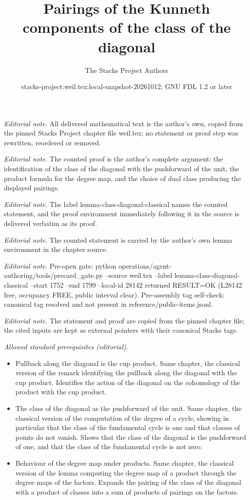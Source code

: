 \documentclass[10pt,a4paper]{amsart}
\title{Pairings of the Kunneth components of the class of the diagonal}
\author{The Stacks Project Authors}
\date{stacks-project:weil.tex:local-snapshot-20261012; GNU FDL 1.2 or later}
\theoremstyle{plain}
\theoremstyle{definition}
\theoremstyle{remark}
\numberwithin{equation}{subsection}
\begin{document}
\maketitle
\noindent\textit{Editorial note.} All delivered mathematical text is the author's own, copied from the pinned Stacks Project chapter file weil.tex; no statement or proof step was rewritten, reordered or removed.\par\medskip
\noindent\textit{Editorial note.} The counted proof is the author's complete argument: the identification of the class of the diagonal with the pushforward of the unit, the product formula for the degree map, and the choice of dual class producing the displayed pairings.\par\medskip
\noindent\textit{Editorial note.} The label lemma-class-diagonal-classical names the counted statement, and the proof environment immediately following it in the source is delivered verbatim as its proof.\par\medskip
\noindent\textit{Editorial note.} The counted statement is carried by the author's own lemma environment in the chapter source.\par\medskip
\noindent\textit{Editorial note.} Pre-open gate: python operations/agent-authoring/tools/precard\_gate.py --source weil.tex --label lemma-class-diagonal-classical --start 1752 --end 1799 --local-id 28142 returned RESULT=OK (L28142 free, occupancy FREE, public interval clear). Pre-assembly tag self-check: canonical tag resolved and not present in reference/public-items.jsonl.\par\medskip
\noindent\textit{Editorial note.} The statement and proof are copied from the pinned chapter file; the cited inputs are kept as external pointers with their canonical Stacks tags.\par\medskip
\noindent\textit{Allowed standard prerequisites (editorial).}\begin{itemize}
\item Pullback along the diagonal is the cup product. Same chapter, the classical version of the remark identifying the pullback along the diagonal with the cup product. Identifies the action of the diagonal on the cohomology of the product with the cup product.
\item The class of the diagonal as the pushforward of the unit. Same chapter, the classical version of the computation of the degree of a cycle, showing in particular that the class of the fundamental cycle is one and that classes of points do not vanish. Shows that the class of the diagonal is the pushforward of one, and that the class of the fundamental cycle is not zero.
\item Behaviour of the degree map under products. Same chapter, the classical version of the lemma computing the degree map of a product through the degree maps of the factors. Expands the pairing of the class of the diagonal with a product of classes into a sum of products of pairings on the factors.
\end{itemize}\medskip
\end{document}
